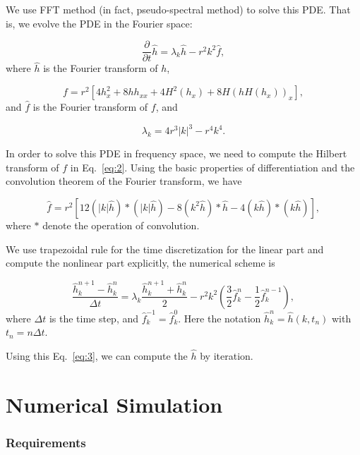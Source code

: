 \documentclass[runningheads]{llncs}
\begin{document}
We use FFT method (in fact, pseudo-spectral method) to solve this PDE. That is, we evolve the PDE in the Fourier space:

\begin{equation}
    \label{eq:fft_pde}
    \frac{\partial}{\partial t}\hat{h}=\lambda_k\hat{h}-r^2k^2\hat{f},
\end{equation}
where $\hat{h}$ is the Fourier transform of $h$,

\begin{equation}
    \label{eq:2}
    f=r^2[4h_x^2+8hh_{xx}+4H^2(h_x)+8H(hH(h_x))_x],
\end{equation}
and $\hat{f}$ is the Fourier transform of $f$, and 

\begin{equation}
    \lambda_k=4r^3|k|^3-r^4k^4.
\end{equation}

In order to solve this PDE in frequency space, we need to compute the Hilbert transform of $f$ in Eq.~\eqref{eq:2}.
Using the basic properties of differentiation and the convolution theorem of the Fourier transform, we have

\begin{equation}
    \label{eq:hatf}
    \hat{f}=r^2[12 (|k| \hat{h})*(|k| \hat{h})-8 (k^2 \hat{h})*\hat{h}-4(k \hat{h})*(k \hat{h})],
\end{equation}
where $*$ denote the operation of convolution.

We use trapezoidal rule for the time discretization for the linear part and compute the nonlinear part explicitly, the numerical scheme is

\begin{equation}
    \label{eq:3}
    \frac{\hat{h}^{n+1}_k-\hat{h}^{n}_k}{\Delta t}=\lambda_k\frac{\hat{h}^{n+1}_k+\hat{h}^{n}_k}2-r^2k^2\left(\frac32\hat{f}^n_k-\frac12\hat{f}^{n-1}_k\right),
\end{equation}
where $\Delta t$ is the time step, and $\hat{f}^{-1}_k=\hat{f}^{0}_k$. Here the notation $\hat{h}^n_k=\hat{h}(k,t_n)$ with $t_n=n\Delta t$.

Using this Eq.~\eqref{eq:3}, we can compute the $\hat{h}$ by iteration.

\section{Numerical Simulation}

\subsubsection{Requirements}
\end{document}
